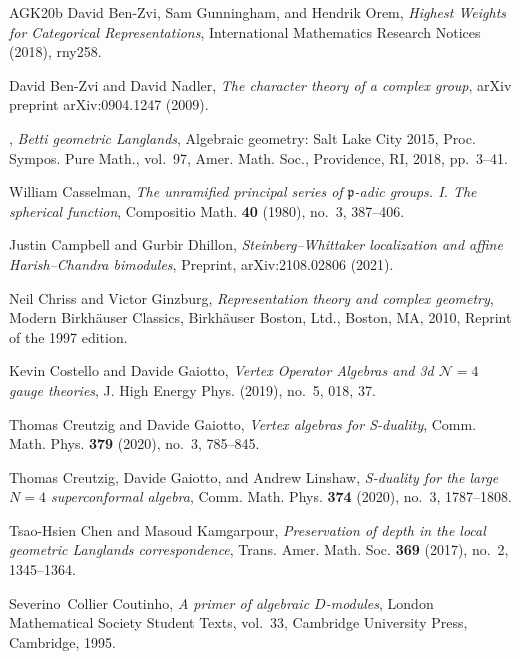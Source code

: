 \begin{thebibliography}{AGK{\etalchar{+}}20b}
David Ben-Zvi, Sam Gunningham, and Hendrik Orem, \emph{{Highest Weights for
  Categorical Representations}}, International Mathematics Research Notices
  (2018), rny258.

David Ben-Zvi and David Nadler, \emph{The character theory of a complex group},
  arXiv preprint arXiv:0904.1247 (2009).

\bysame, \emph{Betti geometric {L}anglands}, Algebraic geometry: {S}alt {L}ake
  {C}ity 2015, Proc. Sympos. Pure Math., vol.~97, Amer. Math. Soc., Providence,
  RI, 2018, pp.~3--41.

William Casselman, \emph{The unramified principal series of
  {${\mathfrak{p}}$}-adic groups. {I}. {T}he spherical function}, Compositio
  Math. \textbf{40} (1980), no.~3, 387--406.

Justin Campbell and Gurbir Dhillon, \emph{Steinberg--{W}hittaker localization
  and affine {H}arish--{C}handra bimodules}, Preprint, arXiv:2108.02806 (2021).

Neil Chriss and Victor Ginzburg, \emph{Representation theory and complex
  geometry}, Modern Birkh\"{a}user Classics, Birkh\"{a}user Boston, Ltd.,
  Boston, MA, 2010, Reprint of the 1997 edition.

Kevin Costello and Davide Gaiotto, \emph{Vertex {O}perator {A}lgebras and 3d
  {$\mathcal N=4$} gauge theories}, J. High Energy Phys. (2019), no.~5, 018,
  37.

Thomas Creutzig and Davide Gaiotto, \emph{Vertex algebras for {S}-duality},
  Comm. Math. Phys. \textbf{379} (2020), no.~3, 785--845.

Thomas Creutzig, Davide Gaiotto, and Andrew Linshaw, \emph{S-duality for the
  large {$N=4$} superconformal algebra}, Comm. Math. Phys. \textbf{374} (2020),
  no.~3, 1787--1808.

Tsao-Hsien Chen and Masoud Kamgarpour, \emph{Preservation of depth in the local
  geometric {L}anglands correspondence}, Trans. Amer. Math. Soc. \textbf{369}
  (2017), no.~2, 1345--1364.

Severino~Collier Coutinho, \emph{A primer of algebraic {$D$}-modules}, London
  Mathematical Society Student Texts, vol.~33, Cambridge University Press,
  Cambridge, 1995.


\end{thebibliography}
